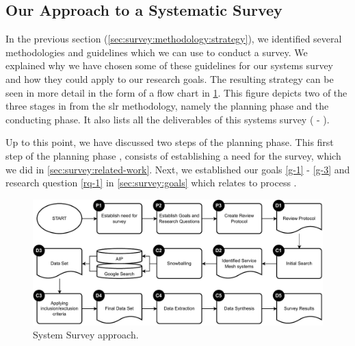 \subsection{Our Approach to a Systematic Survey}
\label{sec:survey:methodology:approach}

In the previous section (\cref{sec:survey:methodology:strategy}), we identified several methodologies and guidelines which we can use to conduct a survey. We explained why we have chosen some of these guidelines for our systems survey and how they could apply to our research goals. The resulting strategy can be seen in more detail in the form of a flow chart in  \cref{fig:survey-methodology}. This figure depicts two of the three stages in from the \gls{slr} methodology, namely the planning phase and the conducting phase. It also lists all the deliverables of this systems survey ( - ). 

Up to this point, we have discussed two steps of the planning phase. This first step of the planning phase , consists of establishing a need for the survey, which we did in \cref{sec:survey:related-work}. Next, we established our goals \ref{g-1} - \ref{g-3} and research question \ref{rq-1} in \cref{sec:survey:goals} which relates to process .




\begin{figure}[!t]
    \centering
    
    \includegraphics[width=\linewidth]{3_systems_survey/figures/survey-methodology}

    \caption{System Survey approach.}
    \label{fig:survey-methodology}
\end{figure}




